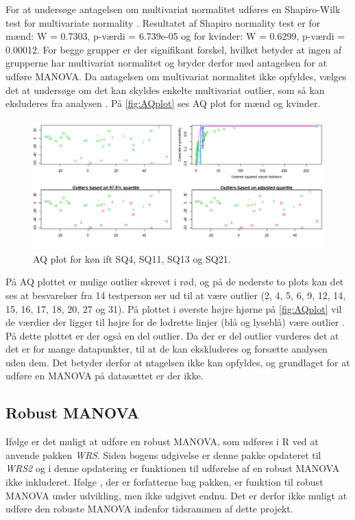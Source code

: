 For at undersøge antagelsen om multivariat normalitet udføres en Shapiro-Wilk test for multivariate normality \parencite[s. 726]{FieldMANOVA}. \blankline
%
Resultatet af Shapiro normality test er for mænd: W = 0.7303, p-værdi = 6.739e-05 og for kvinder: W = 0.6299, p-værdi = 0.00012. For begge grupper er der signifikant forskel, hvilket betyder at ingen af grupperne har multivariat normalitet og bryder derfor med antagelsen for at udføre MANOVA. \blankline
%
Da antagelsen om multivariat normalitet ikke opfyldes, vælges det at undersøge om det kan skyldes enkelte multivariat outlier, som så kan eksluderes fra analysen \parencite[s. 727]{FieldMANOVA}. På \autoref{fig:AQplot} ses AQ plot for mænd og kvinder.  
%
\begin{figure}[H]
\centering
\includegraphics[width = \textwidth]{Figure/DatabehandlingSkalaer/AQplot} 
\caption{AQ plot for køn ift SQ4, SQ11, SQ13 og SQ21.}
\label{fig:AQplot}
\end{figure}
\noindent
%
På AQ plottet er mulige outlier skrevet i rød, og på de nederste to plots kan det ses at besvarelser fra 14 testperson ser ud til at være outlier (2, 4, 5, 6, 9, 12, 14, 15, 16, 17, 18, 20, 27 og 31). \blankline
%
På plottet i øverste højre hjørne på \autoref{fig:AQplot} vil de værdier der ligger til højre for de lodrette linjer (blå og lyseblå) være outlier \parencite[s. 727]{FieldMANOVA}. På dette plottet er der også en del outlier. Da der er del outlier vurderes det at det er for mange datapunkter, til at de kan ekskluderes og forsætte analysen uden dem. Det betyder derfor at ntagelsen ikke kan opfyldes, og grundlaget for at udføre en MANOVA på datasættet er der ikke. 
%
\subsection{Robust MANOVA}
%
Ifølge \textcite[s. 733]{FieldMANOVA} er det muligt at udføre en robust MANOVA, som udføres i R ved at anvende pakken \textit{WRS}. Siden bogens udgivelse er denne pakke opdateret til \textit{WRS2} og i denne opdatering er funktionen til udførelse af en robust MANOVA ikke inkluderet. Ifølge \textcite[s. 30]{WEB:WRS2}, der er forfatterne bag pakken, er funktion til robust MANOVA under udvikling, men ikke udgivet endnu. Det er derfor ikke muligt at udføre den robuste MANOVA indenfor tidsrammen af dette projekt. 